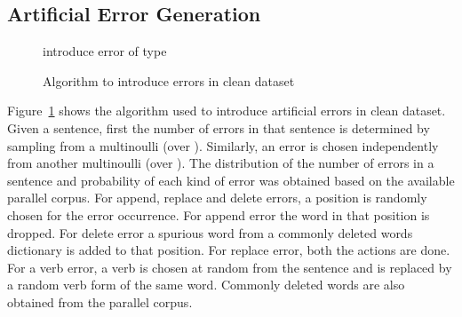 \documentclass[11pt,a4paper]{article}
\begin{document}
\subsection{Artificial Error Generation}
\label{synthetic_gen}
\begin{figure}[h]
\begin{algorithmic}
\State 
\State 
\State 
\State 
{}
    \State 
    \For{}
        \State 
        \State introduce error of type 
    \EndFor
\EndFor
\Return{}
\end{algorithmic}
\caption{Algorithm to introduce errors in clean dataset}
\label{fig:errorgen}
\end{figure}

Figure~\ref{fig:errorgen} shows the algorithm used to introduce artificial errors in clean dataset. Given a sentence, first the number of errors in that sentence is determined by sampling from a multinoulli (over ). Similarly, an error is chosen independently from another multinoulli (over ).
The distribution of the number of errors in a sentence and probability of each kind of error was obtained based on the available parallel corpus.  For append, replace and delete errors, a position is randomly chosen for the error occurrence. For append error the word in that position is dropped. For delete error a spurious word from a commonly deleted words dictionary is added to that position. For replace error, both the actions are done. For a verb error, a verb is chosen at random from the sentence and is replaced by a random verb form of the same word. Commonly deleted words are also obtained from the parallel corpus.
\end{document}
